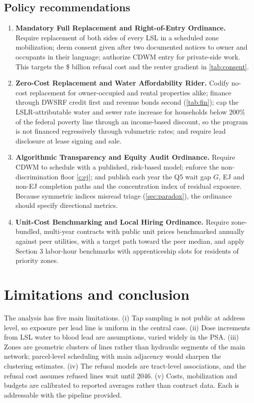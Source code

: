\documentclass[11pt]{article}
\begin{document}
\subsection{Policy recommendations}
\begin{enumerate}[leftmargin=1.4em]
\item \textbf{Mandatory Full Replacement and Right-of-Entry Ordinance.} Require replacement of both
sides of every LSL in a scheduled zone mobilization; deem consent given after two documented
notices to owner and occupants in their language; authorize CDWM entry for private-side work. This
targets the \$\RefCost{} billion refusal cost and the renter gradient in \cref{tab:consent}.
\item \textbf{Zero-Cost Replacement and Water Affordability Rider.} Codify no-cost replacement for
owner-occupied and rental properties alike; finance through DWSRF credit first and revenue bonds
second (\cref{tab:fin}); cap the LSLR-attributable water and sewer rate increase for households
below 200\% of the federal poverty line through an income-based discount, so the program is not
financed regressively through volumetric rates; and require lead disclosure at lease signing and sale.
\item \textbf{Algorithmic Transparency and Equity Audit Ordinance.} Require CDWM to schedule with a
published, risk-based model; enforce the non-discrimination floor \eqref{c:ej}; and publish each
year the Q5 wait gap $G$, EJ and non-EJ completion paths and the concentration index of residual
exposure. Because symmetric indices misread triage (\cref{sec:paradox}), the ordinance should
specify directional metrics.
\item \textbf{Unit-Cost Benchmarking and Local Hiring Ordinance.} Require zone-bundled, multi-year
contracts with public unit prices benchmarked annually against peer utilities, with a target path
toward the peer median, and apply Section 3 labor-hour benchmarks with apprenticeship slots for
residents of priority zones.
\end{enumerate}

\section{Limitations and conclusion}\label{sec:conc}
The analysis has five main limitations. (i) Tap sampling is not public at address level, so
exposure per lead line is uniform in the central case. (ii) Dose increments from LSL water to blood
lead are assumptions, varied widely in the PSA. (iii) Zones are geometric clusters of lines rather
than hydraulic segments of the main network; parcel-level scheduling with main adjacency would
sharpen the clustering estimates. (iv) The refusal models are tract-level associations, and the
refusal cost assumes refused lines wait until 2046. (v) Costs, mobilization and budgets are
calibrated to reported averages rather than contract data. Each is addressable with the pipeline
provided.
\end{document}
